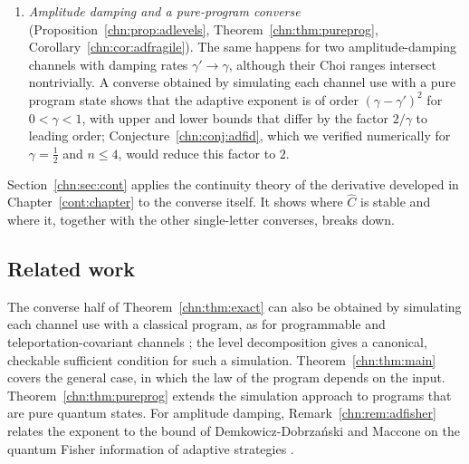 \begin{enumerate}
\item \emph{Amplitude damping and a pure-program converse} (Proposition~\ref{chn:prop:adlevels}, Theorem~\ref{chn:thm:pureprog}, Corollary~\ref{chn:cor:adfragile}). The same happens for two amplitude-damping channels with damping rates $\gamma'\to\gamma$, although their Choi ranges intersect nontrivially. A converse obtained by simulating each channel use with a pure program state shows that the adaptive exponent is of order $(\gamma-\gamma')^2$ for $0<\gamma<1$, with upper and lower bounds that differ by the factor $2/\gamma$ to leading order; Conjecture~\ref{chn:conj:adfid}, which we verified numerically for $\gamma=\frac12$ and $n\le4$, would reduce this factor to $2$.
\end{enumerate}
Section~\ref{chn:sec:cont} applies the continuity theory of the derivative developed in Chapter~\ref{cont:chapter} to the converse itself. It shows where $\widehat C$ is stable and where it, together with the other single-letter converses, breaks down.

\subsection{Related work}
The converse half of Theorem~\ref{chn:thm:exact} can also be obtained by simulating each channel use with a classical program, as for programmable and teleportation-covariant channels \cite{Pirandola2019}; the level decomposition gives a canonical, checkable sufficient condition for such a simulation. Theorem~\ref{chn:thm:main} covers the general case, in which the law of the program depends on the input. Theorem~\ref{chn:thm:pureprog} extends the simulation approach to programs that are pure quantum states. For amplitude damping, Remark~\ref{chn:rem:adfisher} relates the exponent to the bound of Demkowicz-Dobrza\'nski and Maccone on the quantum Fisher information of adaptive strategies \cite{DemkowiczDobrzanskiMaccone2014}.

